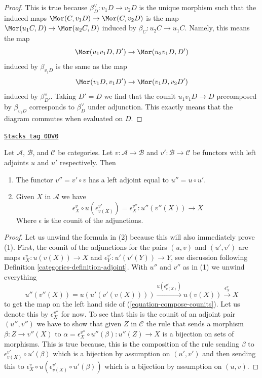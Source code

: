 \begin{proof}
This is true because $\beta^\vee_D : v_1D \to v_2D$ is the unique
morphism such that the induced maps $\Mor(C, v_1D) \to \Mor(C, v_2D)$
is the map $\Mor(u_1C, D) \to \Mor(u_2C, D)$ induced by
$\beta_C : u_2C \to u_1C$. Namely, this means the map
$$
\Mor(u_1 v_1 D, D') \to \Mor(u_2 v_1 D, D')
$$
induced by $\beta_{v_1 D}$ is the same as the map
$$
\Mor(v_1 D, v_1 D') \to \Mor(v_1 D, v_2 D')
$$
induced by $\beta^\vee_{D'}$. Taking $D' = D$ we find that the counit
$u_1 v_1 D \to D$ precomposed by $\beta_{v_1D}$ corresponds to $\beta^\vee_D$
under adjunction. This exactly means that the diagram commutes when
evaluated on $D$.
\end{proof}

\begin{lemma}
\label{categories-lemma-compose-counits}
\href{https://stacks.math.columbia.edu/tag/0DV0}{\texttt{Stacks tag 0DV0}}

Let $\mathcal{A}$, $\mathcal{B}$, and $\mathcal{C}$ be categories.
Let $v : \mathcal{A} \to \mathcal{B}$ and
$v' : \mathcal{B} \to \mathcal{C}$ be functors
with left adjoints $u$ and $u'$ respectively. Then
\begin{enumerate}
\item The functor $v'' = v' \circ v$ has a left adjoint equal to
$u'' = u \circ u'$.
\item Given $X$ in $\mathcal{A}$ we have
\begin{equation}
\label{equation-compose-counits}
\epsilon_X^v \circ u(\epsilon^{v'}_{v(X)}) = \epsilon^{v''}_X :
u''(v''(X)) \to X
\end{equation}
Where $\epsilon$ is the counit of the adjunctions.
\end{enumerate}
\end{lemma}

\begin{proof}

Let us unwind the formula in (2) because this will also immediately
prove (1). First, the counit of the adjunctions for the pairs
$(u, v)$ and $(u', v')$ are maps
$\epsilon_X^v : u(v(X)) \to X$ and
$\epsilon_Y^{v'} : u'(v'(Y)) \to Y$, see discussion following
Definition \ref{categories-definition-adjoint}.
With $u''$ and $v''$ as in (1) we unwind everything
$$
u''(v''(X)) = u(u'(v'(v(X)))) \xrightarrow{u(\epsilon_{v(X)}^{v'})}
u(v(X)) \xrightarrow{\epsilon_X^v} X
$$
to get the map on the left hand side of (\ref{equation-compose-counits}).
Let us denote this by $\epsilon_X^{v''}$ for now.
To see that this is the counit of an adjoint pair
$(u'', v'')$ we have to show that given $Z$ in $\mathcal{C}$
the rule that sends a morphism $\beta : Z \to v''(X)$
to $\alpha = \epsilon_X^{v''} \circ u''(\beta) : u''(Z) \to X$
is a bijection on sets of morphisms.
This is true because, this is the composition of the
rule sending $\beta$ to $\epsilon_{v(X)}^{v'} \circ u'(\beta)$
which is a bijection by assumption on $(u', v')$ and then
sending this to
$\epsilon_X^v \circ u(\epsilon_{v(X)}^{v'} \circ u'(\beta))$
which is a bijection by assumption on $(u, v)$.
\end{proof}

